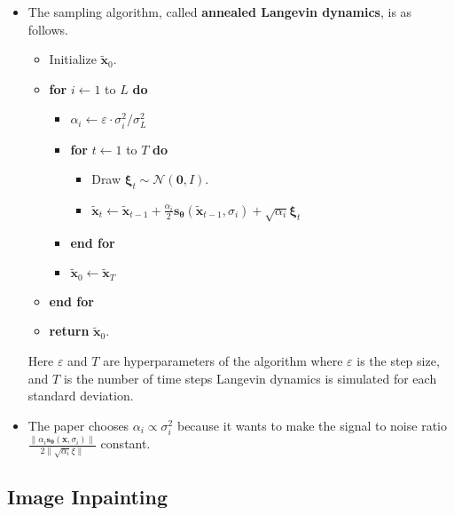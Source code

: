 \documentclass[10pt]{article}
\newcommand{\ve}[1]{\mathbf{#1}}
\newcommand{\ves}[1]{\boldsymbol{#1}}
\newcommand{\mcal}[1]{\mathcal{#1}}
\begin{document}
\begin{itemize}
  \item The sampling algorithm, called {\bf annealed Langevin dynamics}, is as follows.
  \begin{itemize}
    \item[] Initialize $\widetilde{\ve{x}}_0$.
    \item[] {\bf for} $i \gets 1$ to $L$ {\bf do}
    \begin{itemize}
      \item[] $\alpha_i \gets \varepsilon \cdot \sigma_i^2 / \sigma_L^2$      
      \item[] {\bf for} $t \gets 1$ to $T$ {\bf do}
      \begin{itemize}
        \item[] Draw $\ves{\xi}_t \sim \mcal{N}(\ve{0},I)$.
        \item[] $\widetilde{\ve{x}}_t \gets \widetilde{\ve{x}}_{t-1} + \frac{\alpha_i}{2}\ve{s}_{\ves{\theta}}(\widetilde{\ve{x}}_{t-1}, \sigma_i) + \sqrt{\alpha_i} \ve{\xi}_t $
      \end{itemize}
      \item[] {\bf end for}
      \item[] $\widetilde{\ve{x}}_0 \gets \widetilde{\ve{x}}_T$
    \end{itemize}
    \item[] {\bf end for}
    \item[] {\bf return} $\widetilde{\ve{x}}_0$.
  \end{itemize}
  Here $\varepsilon$ and $T$ are hyperparameters of the algorithm where $\varepsilon$ is the step size, and $T$ is the number of time steps Langevin dynamics is simulated for each standard deviation.

  \item The paper chooses $\alpha_i \propto \sigma_i^2$ because it wants to make the signal to noise ratio $\frac{\| \alpha_i \ve{s}_{\ves{\theta}}(\ve{x},\sigma_i) \| }{2 \| \sqrt{\alpha_i} \xi \|}$ constant.
\end{itemize}

\subsection{Image Inpainting}
\end{document}

